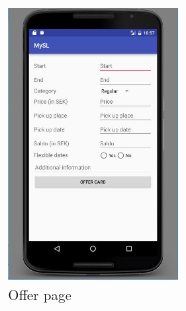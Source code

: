 \documentclass[11pt,twoside,a4paper]{report}
\begin{document}
\begin{appendices}
\begin{figure}
	\centering
	\includegraphics[width=0.4\textwidth]{jpg/android-offer-page.jpg}
	\caption{Offer page}
	\label{figure:offer-page}
\end{figure}

\end{appendices}
\end{document}

